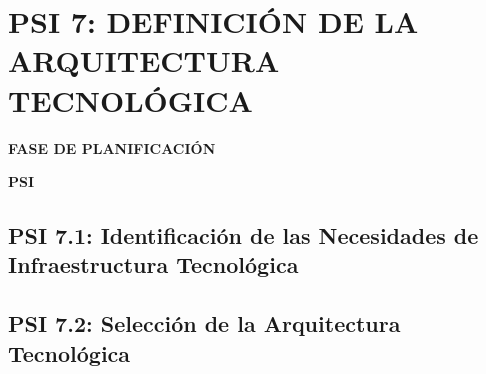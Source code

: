 \chapter{PSI 7: DEFINICIÓN DE LA ARQUITECTURA TECNOLÓGICA}
	\vspace{2cm}	
	\begin{center}
	{\Large \textbf{FASE DE PLANIFICACIÓN} \par}
	\end{center}
	\vspace{5cm}
	
	\begin{center}
	\Huge \textbf{PSI}\par
	\end{center}

\newpage

\section{PSI 7.1: Identificación de las Necesidades de Infraestructura Tecnológica} 

\newpage
\section{PSI 7.2: Selección de la Arquitectura Tecnológica} 

